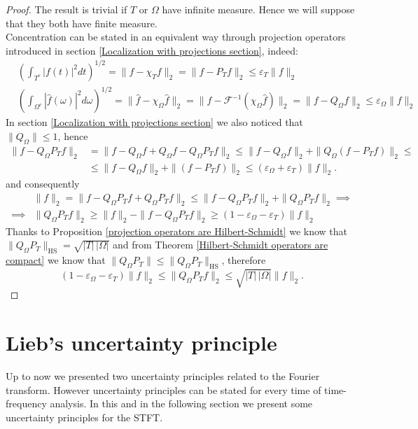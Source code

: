 \documentclass[corpo=11pt, stile=classica, tipotesi=custom,
greek, evenboxes, english]{toptesi}
\numberwithin{equation}{chapter}
\theoremstyle{remark}
\newcommand{\F}{\mathscr{F}} %
\begin{document}
\begin{proof}
	The result is trivial if $T$ or $\Omega$ have infinite measure. Hence we will suppose that they both have finite measure.\\
	Concentration can be stated in an equivalent way through projection operators introduced in section \ref{Localization with projections section}, indeed:
	\begin{align*}
		&\left( \int_{T^c} |f(t)|^2 dt\right)^{1/2} = \|f - \chi_T f\|_2  = \|f - P_T f\|_2 \leq \varepsilon_{T} \|f\|_2\\
		&\left( \int_{\Omega^c} |\hat{f}(\omega)|^2 d\omega\right)^{1/2} = \|\hat{f} - \chi_{\Omega} \hat{f} \|_2 = \|f - \F^{-1} (\chi_{\Omega} \hat{f}) \|_2 = \|f - Q_{\Omega}f \|_2 \leq \varepsilon_{\Omega} \|f\|_2
	\end{align*}
	In section \ref{Localization with projections section} we also noticed that $\|Q_{\Omega}\| \leq 1$, hence
	\begin{align*}
		\|f - Q_{\Omega}P_Tf \|_2 &= \|f - Q_{\Omega}f + Q_{\Omega}f - Q_{\Omega}P_T f \|_2 \leq \|f-Q_{\Omega}f \|_2 + \|Q_{\Omega}(f - P_T f) \|_2 \leq \\
								  &\leq \|f-Q_{\Omega}f \|_2 + \|(f - P_T f) \|_2 \leq (\varepsilon_{\Omega} + \varepsilon_T)\|f\|_2.
	\end{align*}
	and consequently
	\begin{align*}
		&\|f\|_2 = \|f - Q_{\Omega}P_T f + Q_{\Omega}P_T f \|_2 \leq \|f - Q_{\Omega}P_T f\|_2 + \| Q_{\Omega}P_T f  \|_2 \implies\\
		\implies &\|Q_{\Omega}P_T f \|_2 \geq \|f\|_2 - \|f - Q_{\Omega}P_T f\|_2 \geq (1-\varepsilon_{\Omega} - \varepsilon_T)\|f\|_2
	\end{align*}
	Thanks to Proposition \ref{projection operators are Hilbert-Schmidt} we know that $\| Q_{\Omega}P_T\|_{\mathrm{HS}} = \sqrt{|T| \, |\Omega|}$ and from Theorem \ref{Hilbert-Schmidt operators are compact} we know that $\|Q_{\Omega}P_T\| \leq \| Q_{\Omega}P_T\|_{\mathrm{HS}}$, therefore
	\begin{equation*}
		(1-\varepsilon_{\Omega} - \varepsilon_T)\|f\|_2 \leq \|Q_{\Omega}P_T f \|_2 \leq \sqrt{|T| \, |\Omega|} \|f\|_2.
	\end{equation*}
\end{proof}
\section{Lieb's uncertainty principle}\label{section Lieb's UP}
{\color{blue} Up to now we presented two uncertainty principles related to the Fourier transform}. {\color{red}However uncertainty principles can be stated for every time of time-frequency analysis}. {\color{blue}In this and in the following section we present some uncertainty principles for the STFT.}
\end{document}
